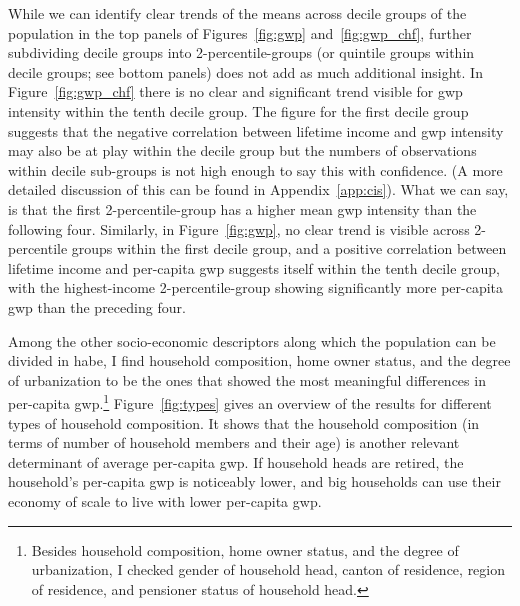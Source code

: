 \documentclass[referee, lineno, pdflatex,sn-apa]{sn-jnl}%
\theoremstyle{thmstyleone}%
\theoremstyle{thmstyletwo}%
\theoremstyle{thmstylethree}%
\begin{document}
While we can identify clear trends of the means across decile groups of the population in the top panels of Figures~\ref{fig:gwp} and~\ref{fig:gwp_chf}, further subdividing decile groups into 2-percentile-groups (or quintile groups within decile groups; see bottom panels) does not add as much additional insight.
In Figure~\ref{fig:gwp_chf} there is no clear and significant trend visible for \ac{gwp} intensity within the tenth decile group.
The figure for the first decile group suggests that the negative correlation between lifetime income and \ac{gwp} intensity may also be at play within the decile group but the numbers of observations within decile sub-groups is not high enough to say this with confidence.
(A more detailed discussion of this can be found in Appendix~\ref{app:cis}).
What we can say, is that the first 2-percentile-group has a higher mean \ac{gwp} intensity than the following four.
Similarly, in Figure~\ref{fig:gwp}, no clear trend is visible across 2-percentile groups within the first decile group, and a positive correlation between lifetime income and per-capita \ac{gwp} suggests itself within the tenth decile group, with the highest-income 2-percentile-group showing significantly more per-capita \ac{gwp} than the preceding four.

Among the other socio-economic descriptors along which the population can be divided in \ac{habe}, I find household composition, home owner status, and the degree of urbanization to be the ones that showed the most meaningful differences in per-capita \ac{gwp}.\footnote{%
  Besides household composition, home owner status, and the degree of urbanization, I checked gender of household head, canton of residence, region of residence, and pensioner status of household head.
}
Figure~\ref{fig:types} gives an overview of the results for different types of household composition.
It shows that the household composition (in terms of number of household members and their age) is another relevant determinant of average per-capita \ac{gwp}.
If household heads are retired, the household's per-capita \ac{gwp} is noticeably lower, and big households can use their economy of scale to live with lower per-capita \ac{gwp}.
\end{document}
